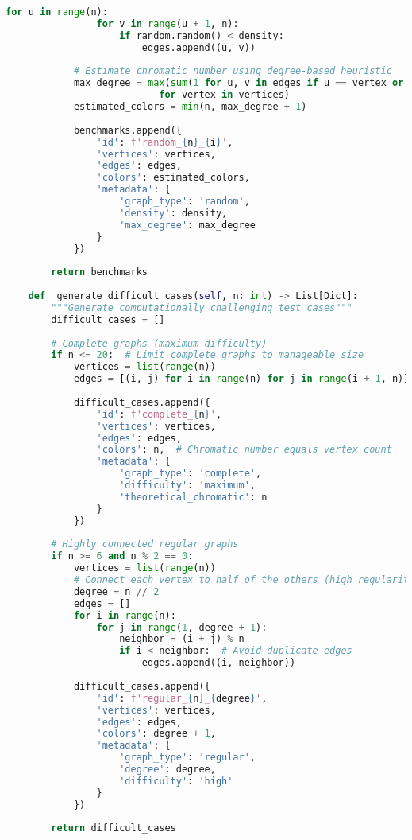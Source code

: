 \begin{lstlisting}[language=Python, caption=Systematic Benchmark Generation]
            for u in range(n):
                for v in range(u + 1, n):
                    if random.random() < density:
                        edges.append((u, v))
            
            # Estimate chromatic number using degree-based heuristic
            max_degree = max(sum(1 for u, v in edges if u == vertex or v == vertex) 
                           for vertex in vertices)
            estimated_colors = min(n, max_degree + 1)
            
            benchmarks.append({
                'id': f'random_{n}_{i}',
                'vertices': vertices,
                'edges': edges,
                'colors': estimated_colors,
                'metadata': {
                    'graph_type': 'random',
                    'density': density,
                    'max_degree': max_degree
                }
            })
        
        return benchmarks
    
    def _generate_difficult_cases(self, n: int) -> List[Dict]:
        """Generate computationally challenging test cases"""
        difficult_cases = []
        
        # Complete graphs (maximum difficulty)
        if n <= 20:  # Limit complete graphs to manageable size
            vertices = list(range(n))
            edges = [(i, j) for i in range(n) for j in range(i + 1, n)]
            
            difficult_cases.append({
                'id': f'complete_{n}',
                'vertices': vertices,
                'edges': edges,
                'colors': n,  # Chromatic number equals vertex count
                'metadata': {
                    'graph_type': 'complete',
                    'difficulty': 'maximum',
                    'theoretical_chromatic': n
                }
            })
        
        # Highly connected regular graphs
        if n >= 6 and n % 2 == 0:
            vertices = list(range(n))
            # Connect each vertex to half of the others (high regularity)
            degree = n // 2
            edges = []
            for i in range(n):
                for j in range(1, degree + 1):
                    neighbor = (i + j) % n
                    if i < neighbor:  # Avoid duplicate edges
                        edges.append((i, neighbor))
            
            difficult_cases.append({
                'id': f'regular_{n}_{degree}',
                'vertices': vertices,
                'edges': edges,
                'colors': degree + 1,
                'metadata': {
                    'graph_type': 'regular',
                    'degree': degree,
                    'difficulty': 'high'
                }
            })
        
        return difficult_cases
\end{lstlisting}

